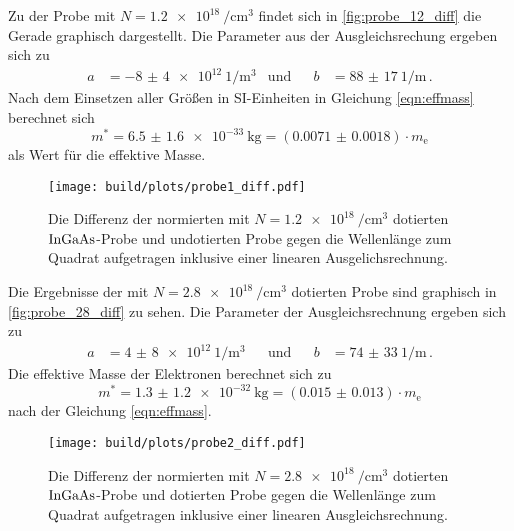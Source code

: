     \noindent Zu der Probe mit $N = \SI{1.2e18}{\per\centi\metre\tothe{3}}$ findet sich in \autoref{fig:probe_12_diff} die Gerade graphisch dargestellt. 
    Die Parameter aus der Ausgleichsrechung ergeben sich zu 
    \begin{align*}
        a &= \SI{-8(4)e12}{1\per\metre\tothe{3}} & \text{und} & & b &= \SI{88(17)}{1\per\metre}\, .
    \end{align*}
    Nach dem Einsetzen aller Größen in SI-Einheiten in Gleichung \eqref{eqn:effmass} berechnet sich 
    \begin{equation*}
        m^* = \SI{6.5(16)e-33}{\kilo\gram} = \left(\num{0.0071(18)}\right)\cdot m_\text{e}
    \end{equation*}
    als Wert für die effektive Masse. 

    \begin{figure}[H]
        \centering
        \texttt{[image: build/plots/probe1\_diff.pdf]}
        \caption{Die Differenz der normierten mit $N = \SI{1.2e18}{\per\centi\metre\tothe{3}}$ dotierten $\ce{InGaAs}$-Probe und undotierten Probe gegen 
        die Wellenlänge zum Quadrat aufgetragen inklusive einer linearen Ausgelichsrechnung.}
        \label{fig:probe_12_diff}
    \end{figure}

    \noindent Die Ergebnisse der mit $N = \SI{2.8e18}{\per\centi\metre\tothe{3}}$ dotierten Probe sind graphisch in \autoref{fig:probe_28_diff} zu sehen. 
    Die Parameter der Ausgleichsrechnung ergeben sich zu 
    \begin{align*}
        a &= \SI{4(8)e12}{1\per\metre\tothe{3}} && \text{und} & & b &= \SI{74(33)}{1\per\metre}\, .
    \end{align*}
    Die effektive Masse der Elektronen berechnet sich zu 
    \begin{equation*}
        m^* = \SI{1.3(12)e-32}{\kilo\gram} = \left(\num{0.015(13)}\right)\cdot m_\text{e}
    \end{equation*}
    nach der Gleichung \eqref{eqn:effmass}.

    \begin{figure}[H]
        \centering
        \texttt{[image: build/plots/probe2\_diff.pdf]}
        \caption{Die Differenz der normierten mit $N = \SI{2.8e18}{\per\centi\metre\tothe{3}}$ dotierten $\ce{InGaAs}$-Probe und dotierten Probe gegen 
        die Wellenlänge zum Quadrat aufgetragen inklusive einer linearen Ausgleichsrechnung.}
        \label{fig:probe_28_diff}
    \end{figure}